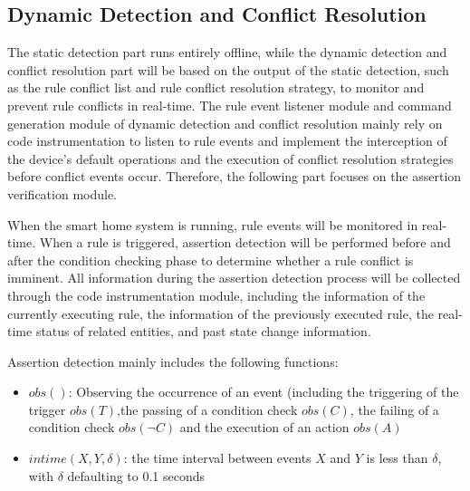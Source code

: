 \subsection{Dynamic Detection and Conflict Resolution}
The static detection part runs entirely offline, while the dynamic detection and conflict resolution part will be based on the output of the static detection, such as the rule conflict list and rule conflict resolution strategy, to monitor and prevent rule conflicts in real-time. The rule event listener module and command generation module of dynamic detection and conflict resolution mainly rely on code instrumentation to listen to rule events and implement the interception of the device's default operations and the execution of conflict resolution strategies before conflict events occur. Therefore, the following part focuses on the assertion verification module.

When the smart home system is running, rule events will be monitored in real-time. When a rule is triggered, assertion detection will be performed before and after the condition checking phase to determine whether a rule conflict is imminent. All information during the assertion detection process will be collected through the code instrumentation module, including the information of the currently executing rule, the information of the previously executed rule, the real-time status of related entities, and past state change information.

Assertion detection mainly includes the following functions:

\begin{itemize}
	\item $obs()$: Observing the occurrence of an event (including the triggering of the trigger $obs(T)$,the passing of a condition check $obs(C)$, the failing of a condition check $obs(\neg C)$ and the execution of an action $obs(A)$
	\item $intime(X,Y,\delta)$: the time interval between events $X$ and $Y$ is less than $\delta$, with $\delta$ defaulting to 0.1 seconds
\end{itemize}

